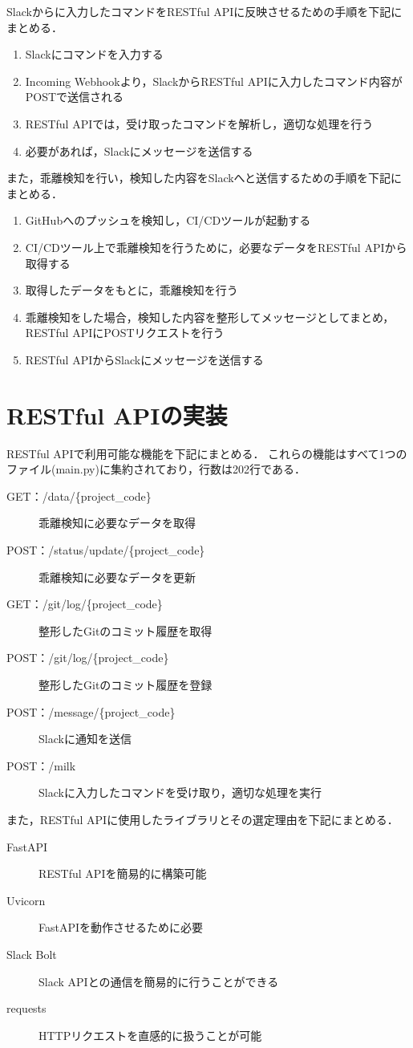 Slackからに入力したコマンドをRESTful APIに反映させるための手順を下記にまとめる．
\begin{enumerate}
    \item Slackにコマンドを入力する
    \item Incoming Webhookより，SlackからRESTful APIに入力したコマンド内容がPOSTで送信される
    \item RESTful APIでは，受け取ったコマンドを解析し，適切な処理を行う
    \item 必要があれば，Slackにメッセージを送信する
\end{enumerate}

また，乖離検知を行い，検知した内容をSlackへと送信するための手順を下記にまとめる．
\begin{enumerate}
    \item GitHubへのプッシュを検知し，CI/CDツールが起動する
    \item CI/CDツール上で乖離検知を行うために，必要なデータをRESTful APIから取得する
    \item 取得したデータをもとに，乖離検知を行う
    \item 乖離検知をした場合，検知した内容を整形してメッセージとしてまとめ，RESTful APIにPOSTリクエストを行う
    \item RESTful APIからSlackにメッセージを送信する
\end{enumerate}

\section{RESTful APIの実装}
RESTful APIで利用可能な機能を下記にまとめる．
これらの機能はすべて1つのファイル(main.py)に集約されており，行数は202行である．
\begin{description}
    \item[GET：/data/\{project\_code\}] 乖離検知に必要なデータを取得
    \item[POST：/status/update/\{project\_code\}]  乖離検知に必要なデータを更新
    \item[GET：/git/log/\{project\_code\}] 整形したGitのコミット履歴を取得
    \item[POST：/git/log/\{project\_code\}] 整形したGitのコミット履歴を登録
    \item[POST：/message/\{project\_code\}] Slackに通知を送信
    \item[POST：/milk] Slackに入力したコマンドを受け取り，適切な処理を実行
\end{description}

また，RESTful APIに使用したライブラリとその選定理由を下記にまとめる．
\begin{description}
    \item[FastAPI] RESTful APIを簡易的に構築可能
    \item[Uvicorn] FastAPIを動作させるために必要
    \item[Slack Bolt] Slack APIとの通信を簡易的に行うことができる
    \item[requests] HTTPリクエストを直感的に扱うことが可能
\end{description}

